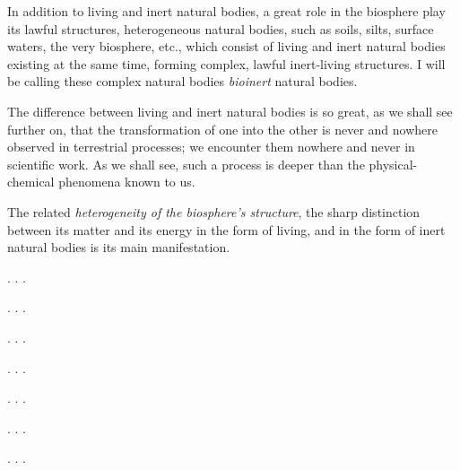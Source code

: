 In addition to living and inert natural bodies, a great role in the biosphere
play its lawful structures, heterogeneous natural bodies, such as soils, silts,
surface waters, the very biosphere, etc., which consist of living and inert
natural bodies existing at the same time, forming complex, lawful inert-living
structures.  I will be calling these complex
natural bodies \emph{bioinert} natural bodies.

The difference between living and inert natural bodies is so great, as we shall
see further on, that the transformation of one into the other is never and
nowhere observed in terrestrial processes; we encounter them nowhere and never
in scientific work.  As we shall see, such a process is deeper than the
physical-chemical phenomena known to us.

The related \emph{heterogeneity of the biosphere's structure}, the sharp
distinction between its matter and its energy in the form of living, and in the
form of inert natural bodies is its main manifestation.


\Section %

. . .

\Section %

. . .

\Section %

. . .

\Section %

. . .

\Section %

. . .

\Section %

. . .

\Section %

. . .

